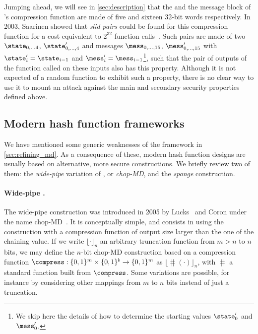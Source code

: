 Jumping ahead, we will see in \autoref{sec:description} that the \iv and the message block of \shaone's compression function are made of five and sixteen
32-bit words respectively. In 2003, Saarinen showed that \emph{slid pairs} could be found for this compression function for a cost equivalent to $2^{32}$
function calls~\cite{DBLP:conf/fse/Saarinen03}. Such pairs are made of two \ivs $\state_{0,\ldots4}$, $\state'_{0,\ldots,4}$ and messages $\mess_{0,\ldots,15}$,
$\mess'_{0,\ldots,15}$ with $\state'_i = \state_{i-1}$ and $\mess'_i = \mess_{i-1}$\footnote{We skip here the details of how to determine the starting values $\state'_0$ and $\mess'_0$.}, such that the
pair of outputs of the function called on these inputs also has this property. Although it is not expected of a random function to exhibit such a property, there is no clear way to use it to mount
an attack against the main and secondary security properties defined above.


\subsection{Modern hash function frameworks}

We have mentioned some generic weaknesses of the \merkdam framework in \autoref{sec:refining_md}. As a consequence of these, modern hash function designs are usually based on alternative,
more secure constructions. We briefly review two of them: the \emph{wide-pipe} variation of \merkdam, or \emph{chop-MD}, and the \emph{sponge} construction.

\paragraph{Wide-pipe \merkdam.} The wide-pipe construction was introduced in 2005 by Lucks~\cite{DBLP:conf/asiacrypt/Lucks05} and Coron \etal under the name chop-MD~\cite{DBLP:conf/crypto/CoronDMP05}.
It is conceptually simple, and consists in using the \merkdam construction with a compression function of output size larger than the one of the chaining value. If we write $\lfloor\cdot\rfloor_n$
an arbitrary truncation function from $m > n$ to $n$ bits, we may define the $n$-bit chop-MD construction based on a compression function $\compress : \{0,1\}^m \times \{0,1\}^b \rightarrow \{0,1\}^m$
as $\lfloor\hash(\cdot)\rfloor_n$, with $\hash$ a standard \merkdam function built from $\compress$. Some variations are possible, for instance by considering other mappings from $m$ to $n$
bits instead of just a truncation.

